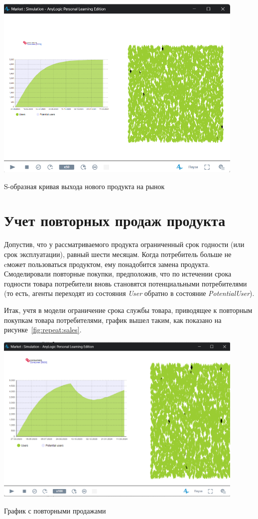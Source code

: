 \begin{image}
	\includegraphics[width=0.9\textwidth]{2023-03-28_17-15-52}
	\caption{S-образная кривая выхода нового продукта на рынок}
	\label{fig:recommend}
\end{image}

\section{Учет повторных продаж продукта}
Допустив, что у рассматриваемого продукта ограниченный срок годности
(или срок эксплуатации), равный шести месяцам.
Когда потребитель больше не cможет пользоваться продуктом, ему понадобится
замена продукта. Смоделировали повторные покупки, предположив, что по
истечении срока годности товара потребители вновь становятся
потенциальными потребителями (то есть, агенты переходят из состояния
\textit{User} обратно в состояние \textit{PotentialUser}).\par
Итак, учтя в модели ограничение срока службы товара, приводящее к
повторным покупкам товара потребителями, график вышел таким, как
показано на рисунке~\ref{fig:repeat:sales}.

\begin{image}
	\includegraphics[width=0.9\textwidth]{2023-03-28_17-20-05}
	\caption{График с повторными продажами}
	\label{fig:repeat:sales}
\end{image}

